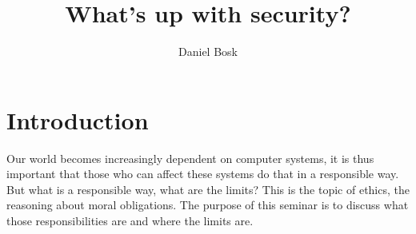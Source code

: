 \title{%
  What's up with security?
}
\author{Daniel Bosk}


\mode*

\begin{abstract}
  
\end{abstract}


\section<article>{Introduction}

Our world becomes increasingly dependent on computer systems, it is thus 
important that those who can affect these systems do that in a responsible 
way.
But what is a responsible way, what are the limits?
This is the topic of ethics, the reasoning about moral obligations.
The purpose of this seminar is to discuss what those responsibilities are and 
where the limits are.



